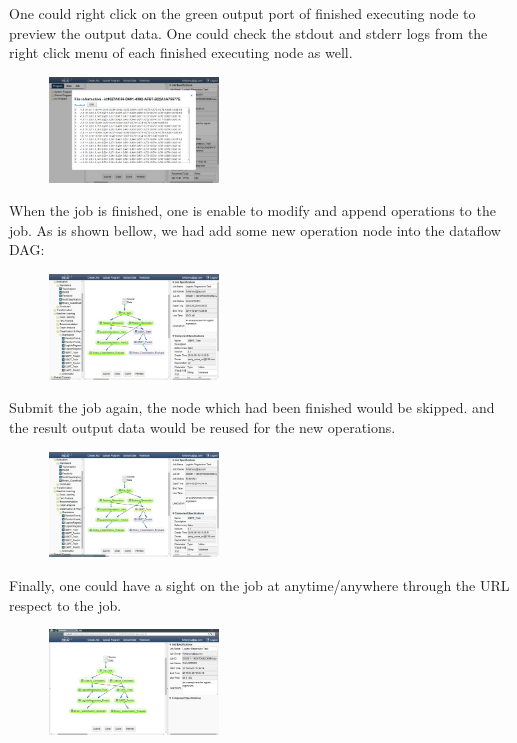 \documentclass{sig-alternate-05-2015}
\begin{document}
One could right click on the green output port of finished executing node to preview the output data. One could check the stdout and stderr logs from the right click menu of each finished executing node as well.

\begin{figure}[!htb]
\centering
\includegraphics[width = 0.4\textwidth]{job_data_output.eps}
\end{figure}

When the job is finished, one is enable to modify and append operations to the job. As is shown bellow, we had add some new operation node into the dataflow DAG:

\begin{figure}[!htb]
\centering
\includegraphics[width = 0.4\textwidth]{job_reuse.eps}
\end{figure}

Submit the job again, the node which had been finished would be skipped. and the result output data would be reused for the new operations.

\begin{figure}[!htb]
\centering
\includegraphics[width = 0.4\textwidth]{job_reuse_submit.eps}
\end{figure}

Finally, one could have a sight on the job at anytime/anywhere through the URL respect to the job.
\begin{figure}[!htb]
\centering
\includegraphics[width = 0.4\textwidth]{job_view.eps}
\end{figure}
\end{document}
